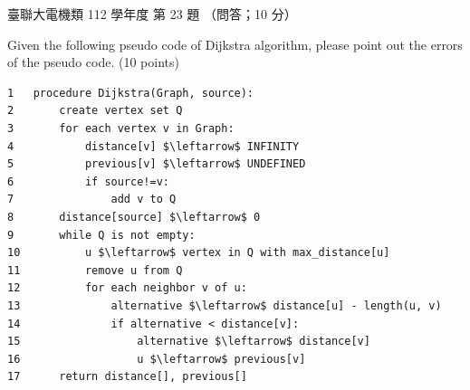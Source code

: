 \begin{pastexam}[label={px:ust-112-ee-ds-23}]{臺聯大電機類 112 學年度 第 23 題}
（問答；10 分）

Given the following pseudo code of Dijkstra algorithm, please point out the errors of the pseudo
code. (10 points)
\begin{lstlisting}[basicstyle=\ttfamily\small, frame=single, columns=fullflexible,
    keepspaces=true, mathescape=true, xleftmargin=3em, xrightmargin=3em]
1   procedure Dijkstra(Graph, source):
2       create vertex set Q
3       for each vertex v in Graph:
4           distance[v] $\leftarrow$ INFINITY
5           previous[v] $\leftarrow$ UNDEFINED
6           if source!=v:
7               add v to Q
8       distance[source] $\leftarrow$ 0
9       while Q is not empty:
10          u $\leftarrow$ vertex in Q with max_distance[u]
11          remove u from Q
12          for each neighbor v of u:
13              alternative $\leftarrow$ distance[u] - length(u, v)
14              if alternative < distance[v]:
15                  alternative $\leftarrow$ distance[v]
16                  u $\leftarrow$ previous[v]
17      return distance[], previous[]
\end{lstlisting}
\end{pastexam}

